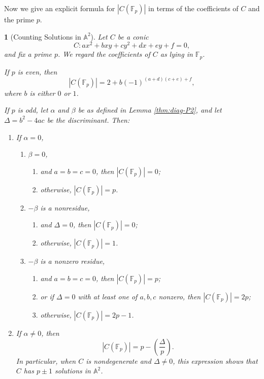 \documentclass[10pt,a4paper]{amsart}
\numberwithin{equation}{section}
\numberwithin{figure}{section}
\numberwithin{table}{section}
\theoremstyle{definition}
\theoremstyle{plain}
\newtheorem{thm}{\protect\theoremname}[section]
\theoremstyle{remark}
\theoremstyle{plain}
\theoremstyle{definition}
\theoremstyle{plain}
\theoremstyle{plain}
\providecommand{\theoremname}{Theorem}
\newcommand{\legendre}[2]{\genfrac{(}{)}{}{}{#1}{#2}}
\newcommand{\A}{\mathbb{A}}
\newcommand{\F}{\mathbb{F}}
\begin{document}
	Now we give an explicit formula for $|C(\F_p)|$ in terms of the coefficients of $C$ and the prime $p$.
	
	\begin{thm}[Counting Solutions in $\A^2$]
		\label{thm:main-thm}
		Let $C$ be a conic
		\[
			C \colon ax^2 + bxy + cy^2 + dx + ey + f = 0,
		\]
		and fix a prime $p$. We regard the coefficients of $C$ as lying in $\F_p$.
		
		If $p$ is even, then
		\begin{equation*}
		|C(\F_p)| = 2 + b(-1)^{(a + d)(c + e) + f},
		\end{equation*}
		where $b$ is either $0$ or $1$.
		
		If $p$ is odd, let $\alpha$ and $\beta$ be as defined in 
		Lemma \ref{thm:diag-P2}, and let $\Delta = b^2-4ac$ be the discriminant. Then:
		\begin{enumerate}
			\item If $\alpha = 0$,
			\begin{enumerate}
				\item $\beta = 0$,
				\begin{enumerate}
					\item and $a=b=c=0$, then $|C(\F_p)| = 0$;
					\item otherwise, $|C(\F_p)|=p$.
				\end{enumerate}
				\item $-\beta$ is a nonresidue,
				\begin{enumerate}
					\item and $\Delta = 0$, then $|C(\F_p)| = 0$;
					\item otherwise, $|C(\F_p)| = 1$.
				\end{enumerate}
				\item $-\beta$ is a nonzero residue,
				\begin{enumerate}
					\item and $a=b=c=0$, then $|C(\F_p)| = p$;
					\item or if $\Delta = 0$ with at least one of $a,b,c$ nonzero, then $|C(\F_p)| = 2p$;
					\item otherwise, $|C(\F_p)| = 2p-1$.
				\end{enumerate}
			\end{enumerate}
			\item If $\alpha \neq 0$, then
			\[
				|C(\F_p)| = p - \legendre{\Delta}{p}.
			\]
			In particular, when $C$ is nondegenerate and $\Delta \neq 0$, this expression shows that $C$ has $p\pm 1$ solutions in $\A^2$.
		\end{enumerate}
	\end{thm}
\end{document}
